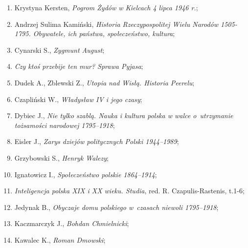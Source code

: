 \documentclass[a4paper,11pt]{article}
\begin{document}
\begin{enumerate}
\item Krystyna Kersten, \textit{Pogrom Żydów w Kielcach 4 lipca 1946
    r.};



\item Andrzej Sulima Kamiński, \textit{Historia Rzeczypospolitej Wielu
    Narodów 1505-1795. Obywatele, ich państwa, społeczeństwo,
    kultura};



\item Cynarski S., \textit{Zygmunt August};



\item \textit{Czy ktoś przebije ten mur? Sprawa Pyjasa};



\item Dudek A., Zblewski Z., \textit{Utopia nad Wisłą. Historia
    Peerelu};



\item Czapliński W., \textit{Władysław IV i jego czasy};



\item Dybiec J., \textit{Nie tylko szablą. Nauka i kultura polska w
    walce o~utrzymanie tożsamości narodowej 1795--1918};



\item Eisler J., \textit{Zarys dziejów politycznych Polski 1944--1989};



\item Grzybowski S., \textit{Henryk Walezy};



\item Ignatowicz I., \textit{Społeczeństwo polskie 1864--1914};



\item \textit{Inteligencja polska XIX i XX wieku. Studia}, red. R.
  Czapulis-Rastenis, t.1-6;



\item Jedynak B., \textit{Obyczaje domu polskiego w~czasach niewoli
    1795--1918};



\item Kaczmarczyk J., \textit{Bohdan Chmielnicki};



\item Kawalec K., \textit{Roman Dmowski};




\end{enumerate}
\end{document}
